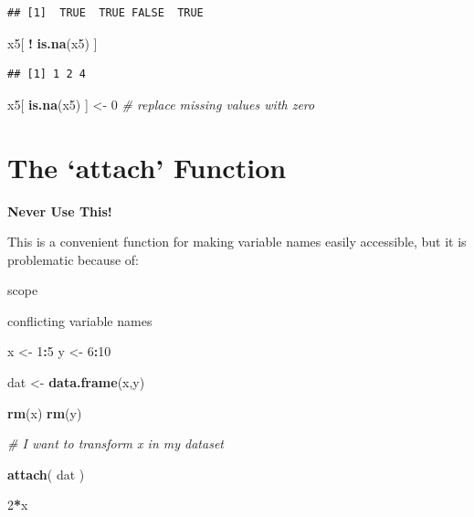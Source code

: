 \documentclass[]{book}
\newenvironment{Shaded}{\begin{snugshade}}{\end{snugshade}}
\newcommand{\CommentTok}[1]{\textcolor[rgb]{0.56,0.35,0.01}{\textit{#1}}}
\newcommand{\DecValTok}[1]{\textcolor[rgb]{0.00,0.00,0.81}{#1}}
\newcommand{\KeywordTok}[1]{\textcolor[rgb]{0.13,0.29,0.53}{\textbf{#1}}}
\newcommand{\NormalTok}[1]{#1}
\newcommand{\OperatorTok}[1]{\textcolor[rgb]{0.81,0.36,0.00}{\textbf{#1}}}
\newcommand{\StringTok}[1]{\textcolor[rgb]{0.31,0.60,0.02}{#1}}
\theoremstyle{definition}
\theoremstyle{definition}
\theoremstyle{definition}
\theoremstyle{remark}
\begin{document}
\begin{verbatim}
## [1]  TRUE  TRUE FALSE  TRUE
\end{verbatim}

\begin{Shaded}
\begin{Highlighting}[]
\NormalTok{x5[ }\OperatorTok{!}\StringTok{ }\KeywordTok{is.na}\NormalTok{(x5) ]}
\end{Highlighting}
\end{Shaded}

\begin{verbatim}
## [1] 1 2 4
\end{verbatim}

\begin{Shaded}
\begin{Highlighting}[]
\NormalTok{x5[ }\KeywordTok{is.na}\NormalTok{(x5) ] <-}\StringTok{ }\DecValTok{0}  \CommentTok{# replace missing values with zero}
\end{Highlighting}
\end{Shaded}

\hypertarget{the-attach-function}{%
\section{The `attach' Function}\label{the-attach-function}}

\textbf{Never Use This!}

This is a convenient function for making variable names easily
accessible, but it is problematic because of:

scope

conflicting variable names

\begin{Shaded}
\begin{Highlighting}[]
\NormalTok{x <-}\StringTok{ }\DecValTok{1}\OperatorTok{:}\DecValTok{5}
\NormalTok{y <-}\StringTok{ }\DecValTok{6}\OperatorTok{:}\DecValTok{10}

\NormalTok{dat <-}\StringTok{ }\KeywordTok{data.frame}\NormalTok{(x,y)}

\KeywordTok{rm}\NormalTok{(x)}
\KeywordTok{rm}\NormalTok{(y)}


\CommentTok{# I want to transform x in my dataset}

\KeywordTok{attach}\NormalTok{( dat )}

\DecValTok{2}\OperatorTok{*}\NormalTok{x}
\end{Highlighting}
\end{Shaded}
\end{document}
